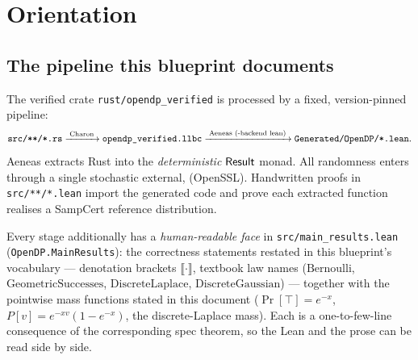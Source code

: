 %
%

\chapter{Orientation}

\section{The pipeline this blueprint documents}

The verified crate \texttt{rust/opendp\_verified} is processed by a fixed,
version-pinned pipeline:
\[
\text{\texttt{src/**/*.rs}} \xrightarrow{\;\text{Charon}\;} \text{\texttt{opendp\_verified.llbc}}
\xrightarrow{\;\text{Aeneas (-backend lean)}\;} \text{\texttt{Generated/OpenDP/*.lean}}.
\]
Aeneas extracts Rust into the \emph{deterministic} \(\mathsf{Result}\) monad. All
randomness enters through a single stochastic external, \fillbytes{} (OpenSSL).
Handwritten proofs in \texttt{src/**/*.lean} import the generated code and prove
each extracted function realises a SampCert reference distribution.

Every stage additionally has a \emph{human-readable face} in
\texttt{src/main\_results.lean} (\texttt{OpenDP.MainResults}): the correctness statements
restated in this blueprint's vocabulary --- denotation brackets
\(\llbracket\cdot\rrbracket\), textbook law names
(\(\mathrm{Bernoulli}\), \(\mathrm{GeometricSuccesses}\),
\(\mathrm{DiscreteLaplace}\), \(\mathrm{DiscreteGaussian}\)) --- together with the
pointwise mass functions stated in this document (\(\Pr[\top]=e^{-x}\),
\(P[v]=e^{-xv}(1-e^{-x})\), the discrete-Laplace mass). Each is a one-to-few-line
consequence of the corresponding spec theorem, so the Lean and the prose can be read side by
side.

